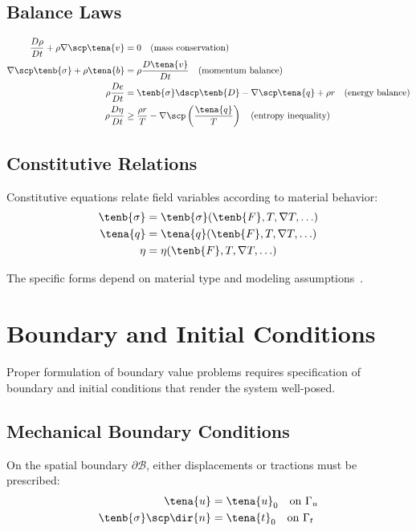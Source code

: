 \subsection{Balance Laws}
\begin{align}
\frac{D\rho}{Dt} + \rho \nabla \scp \tena{v} &= 0 \quad \text{(mass conservation)}\\
\nabla \scp \tenb{\sigma} + \rho \tena{b} &= \rho \frac{D\tena{v}}{Dt} \quad \text{(momentum balance)}\\
\rho \frac{De}{Dt} &= \tenb{\sigma} \dscp \tenb{D} - \nabla \scp \tena{q} + \rho r \quad \text{(energy balance)}\\
\rho \frac{D\eta}{Dt} &\geq \frac{\rho r}{T} - \nabla \scp \left(\frac{\tena{q}}{T}\right) \quad \text{(entropy inequality)}
\end{align}

\subsection{Constitutive Relations}
Constitutive equations relate field variables according to material behavior:
\begin{align}
\tenb{\sigma} &= \tenb{\sigma}(\tenb{F}, T, \nabla T, \ldots)\\
\tena{q} &= \tena{q}(\tenb{F}, T, \nabla T, \ldots)\\
\eta &= \eta(\tenb{F}, T, \nabla T, \ldots)
\end{align}

The specific forms depend on material type and modeling assumptions~\autocite{Sadd.2019}.

\section{Boundary and Initial Conditions}

Proper formulation of boundary value problems requires specification of boundary and initial conditions that render the system well-posed.

\subsection{Mechanical Boundary Conditions}
On the spatial boundary $\partial \mathcal{B}$, either displacements or tractions must be prescribed:
\begin{align}
\tena{u} &= \tena{u}_0 \quad \text{on } \Gamma_u\\
\tenb{\sigma} \scp \dir{n} &= \tena{t}_0 \quad \text{on } \Gamma_t
\end{align}

